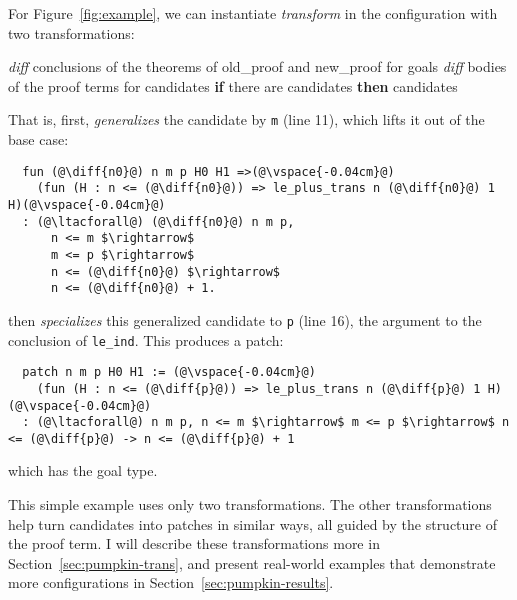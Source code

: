For Figure~\ref{fig:example}, we can instantiate \textit{transform} in the configuration with two transformations:

\begin{algorithm}
\footnotesize
\begin{algorithmic}[1]
    \STATE \textit{diff} conclusions of the theorems of old\_proof and new\_proof for goals
    \STATE \textit{diff} bodies of the proof terms for candidates
    \STATE \textbf{if} there are candidates \textbf{then}
    \STATE \hspace*{1em}  candidates
\end{algorithmic}
\end{algorithm}
That is, first, \sysname \textit{generalizes} the candidate by \lstinline{m} (line 11), which lifts it out of the base case:

\begin{lstlisting}
  fun (@\diff{n0}@) n m p H0 H1 =>(@\vspace{-0.04cm}@)
    (fun (H : n <= (@\diff{n0}@)) => le_plus_trans n (@\diff{n0}@) 1 H)(@\vspace{-0.04cm}@)
  : (@\ltacforall@) (@\diff{n0}@) n m p,
      n <= m $\rightarrow$
      m <= p $\rightarrow$
      n <= (@\diff{n0}@) $\rightarrow$
      n <= (@\diff{n0}@) + 1.
\end{lstlisting}
\sysname then \textit{specializes} this generalized candidate to \lstinline{p} (line 16), the argument
to the conclusion of \lstinline{le_ind}. This produces a patch:

\begin{lstlisting}
  patch n m p H0 H1 := (@\vspace{-0.04cm}@)
    (fun (H : n <= (@\diff{p}@)) => le_plus_trans n (@\diff{p}@) 1 H)(@\vspace{-0.04cm}@)
  : (@\ltacforall@) n m p, n <= m $\rightarrow$ m <= p $\rightarrow$ n <= (@\diff{p}@) -> n <= (@\diff{p}@) + 1
\end{lstlisting}
which has the goal type.

This simple example uses only two transformations.
The other transformations help turn candidates into patches in similar ways, all guided by
the structure of the proof term.
I will describe these transformations more in Section~\ref{sec:pumpkin-trans},
and present real-world examples that demonstrate more configurations in Section~\ref{sec:pumpkin-results}.

